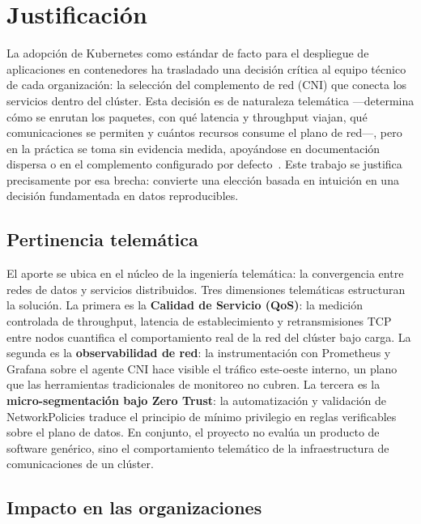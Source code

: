 \chapter{Justificación} \label{sec:Justificacion}

La adopción de Kubernetes como estándar de facto para el despliegue de aplicaciones en contenedores ha trasladado una decisión crítica al equipo técnico de cada organización: la selección del complemento de red (CNI) que conecta los servicios dentro del clúster. Esta decisión es de naturaleza telemática ---determina cómo se enrutan los paquetes, con qué latencia y throughput viajan, qué comunicaciones se permiten y cuántos recursos consume el plano de red---, pero en la práctica se toma sin evidencia medida, apoyándose en documentación dispersa o en el complemento configurado por defecto~\cite{ref29}. Este trabajo se justifica precisamente por esa brecha: convierte una elección basada en intuición en una decisión fundamentada en datos reproducibles.

\section{Pertinencia telemática}

El aporte se ubica en el núcleo de la ingeniería telemática: la convergencia entre redes de datos y servicios distribuidos. Tres dimensiones telemáticas estructuran la solución. La primera es la \textbf{Calidad de Servicio (QoS)}: la medición controlada de throughput, latencia de establecimiento y retransmisiones TCP entre nodos cuantifica el comportamiento real de la red del clúster bajo carga. La segunda es la \textbf{observabilidad de red}: la instrumentación con Prometheus y Grafana sobre el agente CNI hace visible el tráfico este-oeste interno, un plano que las herramientas tradicionales de monitoreo no cubren. La tercera es la \textbf{micro-segmentación bajo Zero Trust}: la automatización y validación de NetworkPolicies traduce el principio de mínimo privilegio en reglas verificables sobre el plano de datos. En conjunto, el proyecto no evalúa un producto de software genérico, sino el comportamiento telemático de la infraestructura de comunicaciones de un clúster.

\section{Impacto en las organizaciones}

